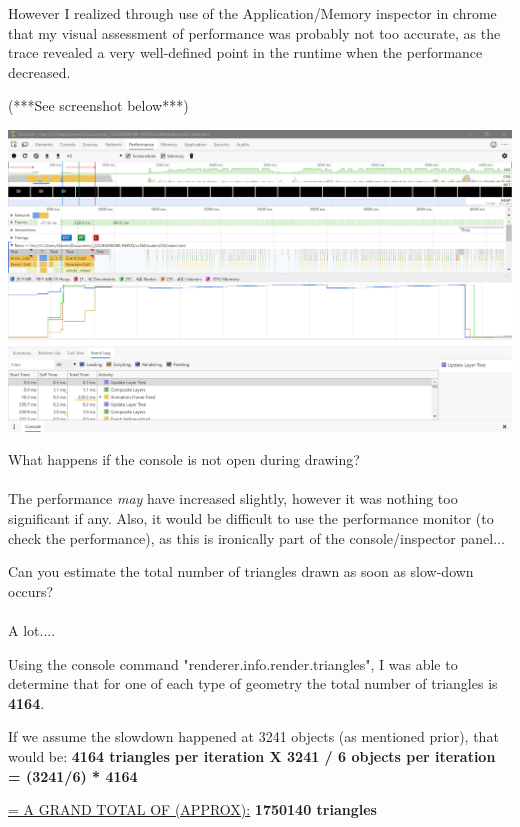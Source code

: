 \documentclass[10pt,oneside,onecolumn,letterpaper]{article}
\begin{document}
\vspace{.5cm}

\noindent However I realized through use of the Application/Memory inspector in chrome that my visual assessment of performance was probably not too accurate, as the trace revealed a very well-defined point in the runtime when the performance decreased. 

\vspace{.5cm}
(***See screenshot below***)
\vspace{1cm}


\begin{center}
    \includegraphics[width=1.0\textwidth]{gfx/performance-monitor-check-1.png}
\end{center}

\vspace{1cm}

\clearpage

\noindent What happens if the console is not open during drawing?
\\~\\
\noindent The performance \textit{may} have increased slightly, however it was nothing too significant if any. Also, it would be difficult to use the performance monitor (to check the performance), as this is ironically part of the console/inspector panel...
\vspace{1cm}

\noindent Can you estimate the total number of triangles drawn as soon as slow-down occurs?
\\~\\
\noindent A lot....
\vspace{.5cm}

\noindent Using the console command "renderer.info.render.triangles", I was able to determine that for one of each type of geometry the total number of triangles is \textbf{4164}.

\vspace{.5cm}


\noindent If we assume the slowdown happened at 3241 objects (as mentioned prior), that would be:
\noindent\textbf{4164 triangles per iteration X 3241 / 6 objects per iteration = (3241/6) * 4164}
\vspace{.5cm}

\noindent\underline{= A GRAND TOTAL OF (APPROX):} \textbf{1750140 triangles}
\end{document}
